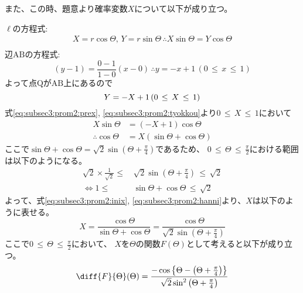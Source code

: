 \documentclass[dvipdfmx,titlepage, 11pt, a4paper]{jsarticle}%
\begin{document}
\begin{enumerate}[(1)]
    また、この時、題意より確率変数$X$について以下が成り立つ。
    
    $\ell$の方程式: 
    \begin{align}
        X = r\cos\Theta, \, Y = r\sin\Theta\, 
        \therefore X\sin\Theta = Y\cos\Theta\label{eq:subsec3:prom2:prex}\\
    \end{align}
    辺$\mathrm{AB}$の方程式:
    \begin{equation*}
        (y - 1) = \frac{0 - 1}{1 - 0}(x - 0)\, \therefore y = -x + 1\, (0\, \leq \, x \, \leq \, 1)
    \end{equation*}
    よって点$\mathrm{Q}$が$\mathrm{AB}$上にあるので
    \begin{equation}
        Y = -X + 1\, (0\, \leq\,  X\, \leq \, 1)\label{eq:subsec3:prom2:tyokkou}\\
    \end{equation}
    式\eqref{eq:subsec3:prom2:prex}, \eqref{eq:subsec3:prom2:tyokkou}より$0\, \leq\, X\, \leq\, 1$において
    \begin{align}
        X\sin\Theta &= (-X + 1)\cos\Theta\nonumber\\
        \therefore \cos\Theta &= X(\sin\Theta + \cos\Theta)\label{eq:subsec3:prom2:inix}
    \end{align}
    ここで$\sin\Theta + \cos\Theta = \sqrt{2}\sin\left(\Theta + \frac{\pi}{4}\right)$であるため、
    $0\, \leq\, \Theta\, \leq \, \frac{\pi}{2}$における範囲は以下のようになる。
    \begin{align}
        \sqrt{2}\times\frac{1}{\sqrt{2}} \leq\, &\sqrt{2}\sin\left(\Theta + \frac{\pi}{4}\right) \, \leq\, \sqrt{2}\nonumber\\
        \Longleftrightarrow 
        1 \leq\, &\sin\Theta + \cos\Theta \, \leq\, \sqrt{2}\label{eq:subsec3:prom2:hanni}
    \end{align}
    よって、式\eqref{eq:subsec3:prom2:inix}, \eqref{eq:subsec3:prom2:hanni}より、$X$は以下のように表せる。
    \begin{equation}
        X = \frac{\cos\Theta}{\sin\Theta + \cos\Theta} = \frac{\cos\Theta}{\sqrt{2}\sin\left(\Theta + \frac{\pi}{4}\right)}\label{eq:subsec3:prom2:x}
    \end{equation}
    ここで$0\, \leq\, \Theta\, \leq\, \frac{\pi}{2}$において、
    $X$を$\Theta$の関数$F(\Theta)$として考えると以下が成り立つ。
    \begin{align*}
        \diff{F}{\Theta}(\Theta) 
        &= \frac{-\cos\left\{\Theta - \left(\Theta + \frac{\pi}{4}\right)\right\}}{\sqrt{2}\sin^{2}\left(\Theta + \frac{\pi}{4}\right)}\\

\end{align*}
\end{enumerate}
\end{document}
